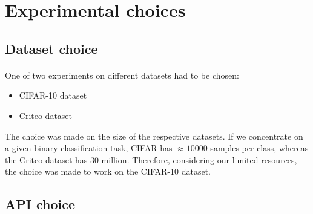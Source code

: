 \documentclass[11 pt]{article}
\begin{document}
\section{Experimental choices}
\subsection{Dataset choice}

	\paragraph{} One of two experiments on different datasets had to be chosen:
	\begin{itemize}
		\item CIFAR-10 dataset
		\item Criteo dataset
	\end{itemize}

	The choice was made on the size of the respective datasets. If we concentrate on a given binary classification task, CIFAR has \(\approx 10000\) samples per class, whereas the Criteo dataset has \(30\) million. Therefore, considering our limited resources, the choice was made to work on the CIFAR-10 dataset.

\subsection{API choice}
\end{document}
